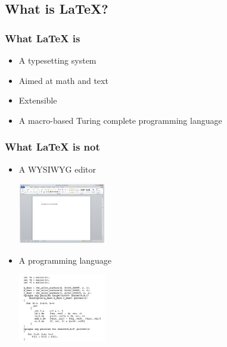 \documentclass[utf8x]{beamer}
\begin{document}
  \subsection{What is \LaTeX?}
    \begin{frame}
      \frametitle{What \LaTeX{} is}
      \begin{itemize}
        \item A typesetting system \pause
        \item Aimed at math and text \pause
        \item Extensible \pause
        \item A macro-based Turing complete programming language
      \end{itemize}
    \end{frame}
    \begin{frame}
      \frametitle{What \LaTeX{} is not}
      \begin{itemize}
        \item A WYSIWYG editor
        \begin{center}\includegraphics[width=0.3\textwidth]{Word_2010}\end{center}%
        \pause \item A programming language
        \begin{center}\includegraphics[width=0.3\textwidth]{programming}\end{center}%
      \end{itemize}
    \end{frame}
\end{document}
